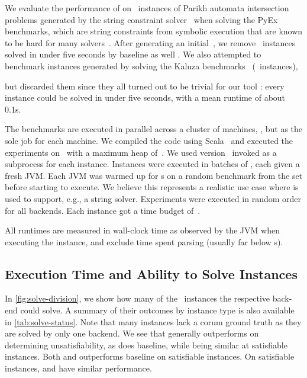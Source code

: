 
We evaluate the performance of \Catra{} on~\NrBenchmarks{} instances of Parikh
automata intersection problems generated by the \OstrichPlus{} string constraint
solver~\cite{ostrich-plus} when solving the PyEx benchmarks, 
which are string constraints from symbolic execution that are known
to be hard for many solvers~\cite{pyex}. After generating an
initial~\InitialNrBenchmarks{}, we remove~\NrTrivial{} instances solved in under
five seconds by baseline as well .
 We also attempted to benchmark instances generated by
\OstrichPlus{} solving the Kaluza benchmarks~\cite{Saxena10:kaluza}
(~instances),
\iffalse
and pyex-len
(\numprint{791}~instances) benchmark suites\fi
but discarded them since they all turned out to be trivial for our tool
\Catra{}: every instance
could be solved in under five seconds, with a mean runtime of about 0.1s.

The benchmarks are executed in parallel across a cluster of 
machines, \BenchmarkRig{}, but as the sole job for each machine.  We compiled
the code using Scala~\ScalaVersion{} and executed the experiments
on~\JvmVersion{} with a maximum heap of~\MaxHeapSize{}. We used \Nuxmv{}
version~\NuxmvVersion{} invoked as a subprocess for each instance. Instances
were executed in batches of \BatchSize{}, each given a fresh JVM. Each JVM was
warmed up for s on a random benchmark from the set before starting
to execute. We believe this represents a realistic use case where \Calculus{} is
used to support, e.g., a string solver. Experiments were executed in random order
for all backends. Each instance got a time budget of~\RuntimeTimeout.

All runtimes are measured in wall-clock time as observed by the JVM when
executing the instance, and exclude time spent parsing (usually far below
s).

\subsection{Execution Time and Ability to Solve Instances}\label{sec:runtime}

In \cref{fig:solve-division}, we show how many of the~\NrBenchmarks{} instances
the respective back-end could solve. A summary of their outcomes by instance
type is also available in \cref{tab:solve-status}. Note that many instances lack
a corum ground truth as they are solved by only one backend. We see that
\Calculus{} generally outperforms \Nuxmv{} on determining unsatisfiability, as
does baseline, while being similar at satisfiable instances. Both \Calculus{} and
\Nuxmv outperforms baseline on satisfiable instances. On satisfiable
instances, \Nuxmv and \Calculus{} have similar performance.


